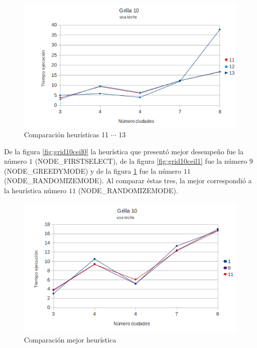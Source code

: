 \documentclass[10pt]{article}
\begin{document}
\begin{figure}[ht]
\begin{minipage}[b]{1\linewidth}
  \centering
 \includegraphics[scale=0.4]{grilla10ceil2.png}
 \caption{Comparación heurísticas  11 $\cdots$ 13}
 \label{fig:grid10ceil2}
\end{minipage}

\end{figure}


De la figura \ref{fig:grid10ceil0} la heurística que presentó mejor desempeño fue la número $1$ (NODE\_FIRSTSELECT), de la figura \ref{fig:grid10ceil1} fue la número $9$ (NODE\_GREEDYMODE) y de la 
figura \ref{fig:grid10ceil2} fue la número $11$ (NODE\_RANDOMIZEMODE). Al comparar éstas tres, la mejor correspondió a la heurística número $11$ (NODE\_RANDOMIZEMODE).

\begin{figure}[ht]
\begin{minipage}[b]{1\linewidth}
 \centering
 \includegraphics[scale=0.4]{grilla10ceil3.png}
 \caption{Comparación mejor heurística}
 \label{fig:grid10ceil3}
\end{minipage}
\end{figure}
\end{document}
